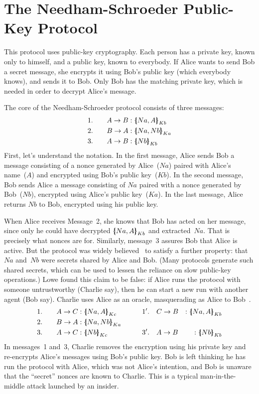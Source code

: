 \section{The Needham-Schroeder Public-Key Protocol}\label{sec:ns-protocol}

This protocol uses public-key cryptography. Each person has a private key, known only to
himself, and a public key, known to everybody. If Alice wants to send Bob a secret message, she
encrypts it using Bob's public key (which everybody knows), and sends it to Bob. Only Bob has the
matching private key, which is needed in order to decrypt Alice's message.

The core of the Needham-Schroeder protocol consists of three messages:
\begin{alignat*}{2}
  &1.&\quad  A\to B  &: \mathopen{\{\kern-.30em|} Na,A\mathclose{|\kern-.32em\}}\sb{Kb} \\
  &2.&\quad  B\to A  &: \mathopen{\{\kern-.30em|} Na,Nb\mathclose{|\kern-.32em\}}\sb{Ka} \\
  &3.&\quad  A\to B  &: \mathopen{\{\kern-.30em|} Nb\mathclose{|\kern-.32em\}}\sb{Kb}
\end{alignat*}
First, let's understand the notation. In the first message, Alice
sends Bob a message consisting of a nonce generated by Alice~($Na$)
paired  with Alice's name~($A$) and encrypted using Bob's public
key~($Kb$). In the second message, Bob sends Alice a message
consisting of $Na$ paired with a nonce generated by Bob~($Nb$), 
encrypted using Alice's public key~($Ka$). In the last message, Alice
returns $Nb$ to Bob, encrypted using his public key.

When Alice receives Message~2, she knows that Bob has acted on her
message, since only he could have decrypted
$\mathopen{\{\kern-.30em|} Na,A\mathclose{|\kern-.32em\}}\sb{Kb}$ and extracted~$Na$.  That is precisely what
nonces are for.  Similarly, message~3 assures Bob that Alice is
active.  But the protocol was widely believed~\cite{ban89} to satisfy a
further property: that
$Na$ and~$Nb$ were secrets shared by Alice and Bob.  (Many
protocols generate such shared secrets, which can be used
to lessen the reliance on slow public-key operations.)  Lowe found this
claim to be false: if Alice runs the protocol with someone untrustworthy
(Charlie say), then he can start a new run with another agent (Bob say). 
Charlie uses Alice as an oracle, masquerading as
Alice to Bob~\cite{lowe-fdr}.
\begin{alignat*}{4}
  &1.&\quad  A\to C  &: \comp{Na,A}\sb{Kc}   & 
      \qquad 1'.&\quad  C\to B  &: \comp{Na,A}\sb{Kb} \\
  &2.&\quad  B\to A  &: \comp{Na,Nb}\sb{Ka} \\
  &3.&\quad  A\to C  &: \comp{Nb}\sb{Kc}  &
      3'.&\quad  A\to B  &: \comp{Nb}\sb{Kb}
\end{alignat*}
In messages~1 and~3, Charlie removes the encryption using his private
key and re-encrypts Alice's messages using Bob's public key. Bob is
left thinking he has run the protocol with Alice, which was not
Alice's intention, and Bob is unaware that the ``secret'' nonces are
known to Charlie.  This is a typical man-in-the-middle attack launched
by an insider.

